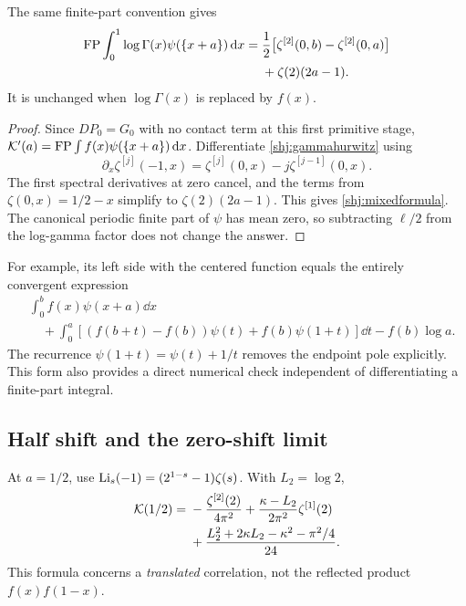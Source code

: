 \begin{corollary}\label{shj:mixedgamma}
The same finite-part convention gives
\begin{align}
\operatorname{FP}\int_0^1\log\Gamma(x)\psi(\{x+a\})\,\mathrm d x
={}&\frac12\big[\zeta^{[2]}(0,b)-\zeta^{[2]}(0,a)\big]\notag\\
&+\zeta(2)(2a-1).
\label{shj:mixedformula}
\end{align}
It is unchanged when $\log\Gamma(x)$ is replaced by $f(x)$.
\end{corollary}
\begin{proof}
Since $DP_0=G_0$ with no contact term at this first primitive stage,
$\mathcal K'(a)=\operatorname{FP}\int f(x)\psi(\{x+a\})\,\mathrm d x$.
Differentiate \eqref{shj:gammahurwitz} using
\[
\partial_x\zeta^{[j]}(-1,x)
=\zeta^{[j]}(0,x)-j\zeta^{[j-1]}(0,x).
\]
The first spectral derivatives at zero cancel, and the terms from
$\zeta(0,x)=1/2-x$ simplify to $\zeta(2)(2a-1)$. This gives \eqref{shj:mixedformula}. The canonical periodic finite part of $\psi$ has mean zero, so subtracting $\ell/2$ from the log-gamma factor does not change the answer.
\end{proof}
For example, its left side with the centered function equals the entirely convergent expression
\begin{align*}
&\int_0^b f(x)\psi(x+a)\dd x\\
&\quad+\int_0^a\left[(f(b+t)-f(b))\psi(t)+f(b)\psi(1+t)\right]\dd t
-f(b)\log a.
\end{align*}
The recurrence $\psi(1+t)=\psi(t)+1/t$ removes the endpoint pole explicitly. This form also provides a direct numerical check independent of differentiating a finite-part integral.

\subsection{Half shift and the zero-shift limit}
At $a=1/2$, use $\operatorname{Li}_s(-1)=(2^{1-s}-1)\zeta(s)$. With $L_2=\log2$,
\begin{align}
\mathcal K(1/2)={}&-\frac{\zeta^{[2]}(2)}{4\pi^2}
+\frac{\kappa-L_2}{2\pi^2}\zeta^{[1]}(2)\notag\\
&+\frac{L_2^2+2\kappa L_2-\kappa^2-\pi^2/4}{24}.
\label{shj:gammahalf}
\end{align}
This formula concerns a \emph{translated} correlation, not the reflected product $f(x)f(1-x)$.

